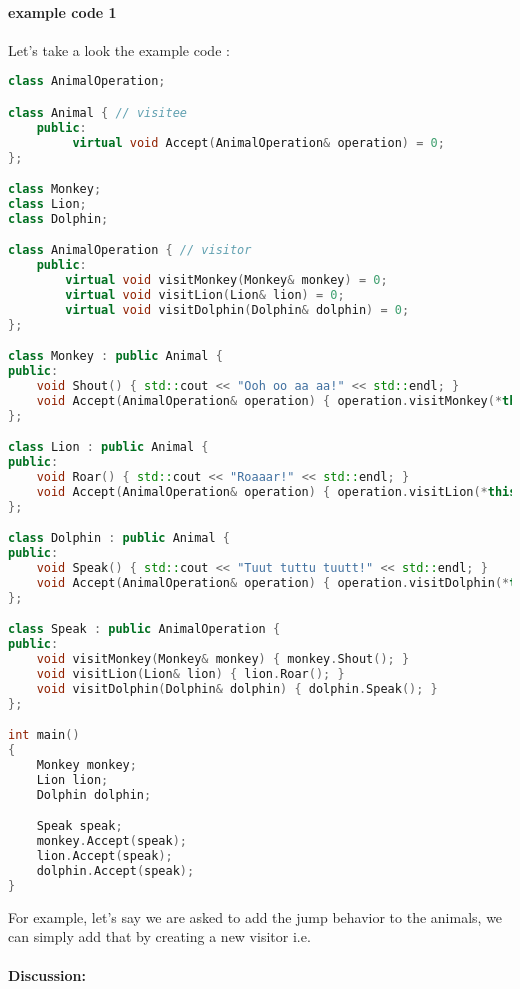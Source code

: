 \documentclass{book}
\begin{document}
\paragraph{example code 1}
Let's take a look the example code :
\begin{lstlisting}[caption={visitor pattern sample code 1},label={lst:vps1},language=C++]
class AnimalOperation;

class Animal { // visitee
    public:
         virtual void Accept(AnimalOperation& operation) = 0;
};

class Monkey;
class Lion;
class Dolphin;

class AnimalOperation { // visitor
    public:
        virtual void visitMonkey(Monkey& monkey) = 0;
        virtual void visitLion(Lion& lion) = 0;
        virtual void visitDolphin(Dolphin& dolphin) = 0;
};

class Monkey : public Animal {
public:
    void Shout() { std::cout << "Ooh oo aa aa!" << std::endl; }
    void Accept(AnimalOperation& operation) { operation.visitMonkey(*this); }
};

class Lion : public Animal {
public:
    void Roar() { std::cout << "Roaaar!" << std::endl; }
    void Accept(AnimalOperation& operation) { operation.visitLion(*this); }
};

class Dolphin : public Animal {
public:
    void Speak() { std::cout << "Tuut tuttu tuutt!" << std::endl; }
    void Accept(AnimalOperation& operation) { operation.visitDolphin(*this); }
};

class Speak : public AnimalOperation {
public:
    void visitMonkey(Monkey& monkey) { monkey.Shout(); }
    void visitLion(Lion& lion) { lion.Roar(); }
    void visitDolphin(Dolphin& dolphin) { dolphin.Speak(); }
};

int main()
{
    Monkey monkey;
    Lion lion;
    Dolphin dolphin;

    Speak speak;
    monkey.Accept(speak);
    lion.Accept(speak);
    dolphin.Accept(speak);
}
\end{lstlisting}
 For example, let's say we are asked to add the jump behavior to the animals, we can simply add that by creating a new visitor i.e.
\paragraph{Discussion:}
\end{document}

